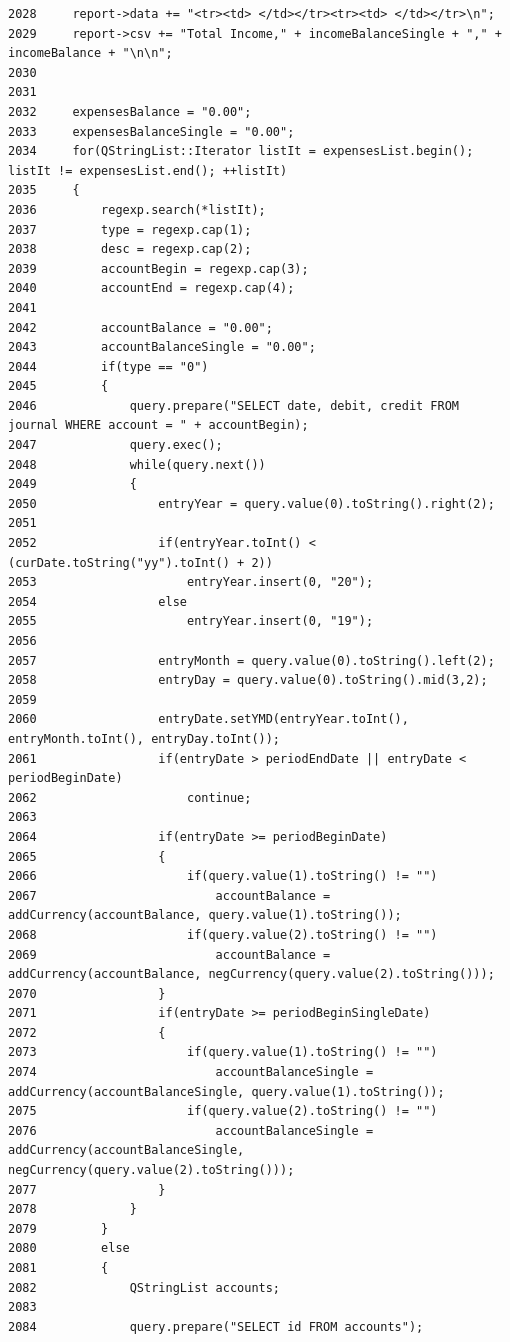 \begin{verbatim}
2028     report->data += "<tr><td> </td></tr><tr><td> </td></tr>\n";
2029     report->csv += "Total Income," + incomeBalanceSingle + "," + incomeBalance + "\n\n";
2030 
2031 
2032     expensesBalance = "0.00";
2033     expensesBalanceSingle = "0.00";
2034     for(QStringList::Iterator listIt = expensesList.begin(); listIt != expensesList.end(); ++listIt)
2035     {
2036         regexp.search(*listIt);
2037         type = regexp.cap(1);
2038         desc = regexp.cap(2);
2039         accountBegin = regexp.cap(3);
2040         accountEnd = regexp.cap(4);
2041 
2042         accountBalance = "0.00";
2043         accountBalanceSingle = "0.00";
2044         if(type == "0")
2045         {
2046             query.prepare("SELECT date, debit, credit FROM journal WHERE account = " + accountBegin);
2047             query.exec();
2048             while(query.next())
2049             {
2050                 entryYear = query.value(0).toString().right(2);
2051 
2052                 if(entryYear.toInt() < (curDate.toString("yy").toInt() + 2))
2053                     entryYear.insert(0, "20");
2054                 else
2055                     entryYear.insert(0, "19");
2056 
2057                 entryMonth = query.value(0).toString().left(2);
2058                 entryDay = query.value(0).toString().mid(3,2);
2059 
2060                 entryDate.setYMD(entryYear.toInt(), entryMonth.toInt(), entryDay.toInt());
2061                 if(entryDate > periodEndDate || entryDate < periodBeginDate)
2062                     continue;
2063 
2064                 if(entryDate >= periodBeginDate)
2065                 {
2066                     if(query.value(1).toString() != "")
2067                         accountBalance = addCurrency(accountBalance, query.value(1).toString());
2068                     if(query.value(2).toString() != "")
2069                         accountBalance = addCurrency(accountBalance, negCurrency(query.value(2).toString()));
2070                 }
2071                 if(entryDate >= periodBeginSingleDate)
2072                 {
2073                     if(query.value(1).toString() != "")
2074                         accountBalanceSingle = addCurrency(accountBalanceSingle, query.value(1).toString());
2075                     if(query.value(2).toString() != "")
2076                         accountBalanceSingle = addCurrency(accountBalanceSingle, negCurrency(query.value(2).toString()));
2077                 }
2078             }
2079         }
2080         else
2081         {
2082             QStringList accounts;
2083 
2084             query.prepare("SELECT id FROM accounts");

\end{verbatim}
